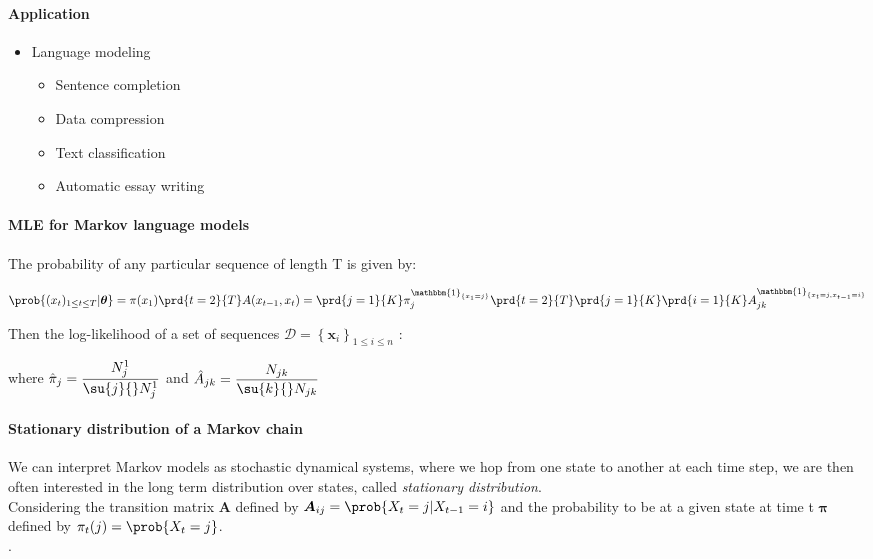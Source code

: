 \paragraph{Application}
\begin{itemize}
    \item Language modeling
    \begin{itemize}
        \item Sentence completion
        \item Data compression
        \item Text classification
        \item Automatic essay writing
    \end{itemize}
\end{itemize}
\paragraph{MLE for Markov language models}
The probability of any particular sequence of length T is given by:
\begin{center}
    $
\prob{(x_{t})_{1\leq t\leq T}|\bm{\theta}} = \pi(x_{1})\prd{t=2}{T}A(x_{t-1},x_{t}) = 
\prd{j=1}{K}\pi_{j}^{\mathbbm{1}_{\{x_{1}=j\}}}\prd{t=2}{T}\prd{j=1}{K}\prd{i=1}{K}
A_{jk}^{\mathbbm{1}_{\{x_{t}=j,x_{t-1}=i\}}}
$
\end{center}

Then the log-likelihood of a set of sequences $\mathcal{D}=\left\{\bm{x}_{i}\right\}_{1\leq i\leq n}$
:
\begin{center}
\end{center}
where $\hat{\pi}_{j}=\dfrac{N_{j}^{1}}{\su{j}{}N_{j}^{1}}$ and 
$\hat{A}_{jk}=\dfrac{N_{jk}}{\su{k}{}N_{jk}}$

\paragraph{Stationary distribution of a Markov chain}
We can interpret Markov models as stochastic dynamical systems, where we hop from one state to 
another at each time step, we are then often interested in the long term distribution over states, 
called \emph{stationary distribution}.\\
Considering the transition matrix $\bm{A}$ defined by $\bm{A}_{ij}=\prob{X_{t}=j|X_{t-1}=i}$ and 
the probability to be at a given state at time t $\bm{\pi}$ defined by $\pi_{t}(j)=\prob{X_{t}=j}$.\\
.\\



